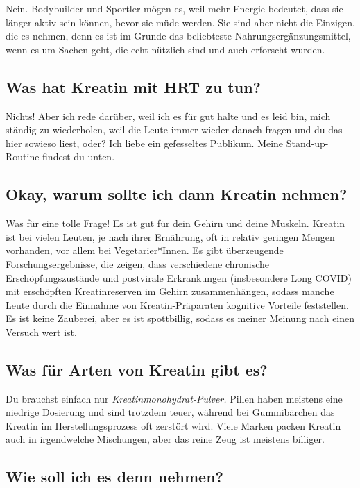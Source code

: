 \documentclass{article}
\begin{document}
Nein. Bodybuilder und Sportler mögen es, weil mehr Energie bedeutet, dass sie länger aktiv sein können, bevor sie müde werden. Sie sind aber nicht die Einzigen, die es nehmen, denn es ist im Grunde das beliebteste Nahrungsergänzungsmittel, wenn es um Sachen geht, die echt nützlich sind und auch erforscht wurden.

\subsection{Was hat Kreatin mit HRT zu tun?}

Nichts! Aber ich rede darüber, weil ich es für gut halte und es leid bin, mich ständig zu wiederholen, weil die Leute immer wieder danach fragen und du das hier sowieso liest, oder? Ich liebe ein gefesseltes Publikum. Meine Stand-up-Routine findest du unten.

\subsection{Okay, warum sollte ich dann Kreatin nehmen?}

Was für eine tolle Frage! Es ist gut für dein Gehirn und deine Muskeln. Kreatin ist bei vielen Leuten, je nach ihrer Ernährung, oft in relativ geringen Mengen vorhanden, vor allem bei Vegetarier*Innen. Es gibt überzeugende Forschungsergebnisse, die zeigen, dass verschiedene chronische Erschöpfungszustände und postvirale Erkrankungen (insbesondere Long COVID) mit erschöpften Kreatinreserven im Gehirn zusammenhängen, sodass manche Leute durch die Einnahme von Kreatin-Präparaten kognitive Vorteile feststellen. Es ist keine Zauberei, aber es ist spottbillig, sodass es meiner Meinung nach einen Versuch wert ist.

\subsection{Was für Arten von Kreatin gibt es?}

Du brauchst einfach nur \textit{Kreatinmonohydrat-Pulver.} Pillen haben meistens eine niedrige Dosierung und sind trotzdem teuer, während bei Gummibärchen das Kreatin im Herstellungsprozess oft zerstört wird. Viele Marken packen Kreatin auch in irgendwelche Mischungen, aber das reine Zeug ist meistens billiger.

\subsection{Wie soll ich es denn nehmen?}
\end{document}
